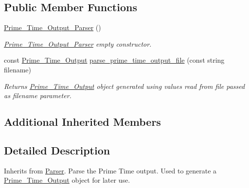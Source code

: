 \subsection*{Public Member Functions}
\begin{DoxyCompactItemize}
\item 
\hyperlink{classPrime__Time__Output__Parser_abbd1008efff182a6b8ce0f676b4ee823}{Prime\-\_\-\-Time\-\_\-\-Output\-\_\-\-Parser} ()
\begin{DoxyCompactList}\small\item\em \hyperlink{classPrime__Time__Output__Parser}{Prime\-\_\-\-Time\-\_\-\-Output\-\_\-\-Parser} empty constructor. \end{DoxyCompactList}\item 
const \hyperlink{classPrime__Time__Output__Parser_1_1Prime__Time__Output}{Prime\-\_\-\-Time\-\_\-\-Output} \hyperlink{classPrime__Time__Output__Parser_af43de199ba4575214a4d6e07fb980ca5}{parse\-\_\-prime\-\_\-time\-\_\-output\-\_\-file} (const string filename)
\begin{DoxyCompactList}\small\item\em Returns \hyperlink{classPrime__Time__Output__Parser_1_1Prime__Time__Output}{Prime\-\_\-\-Time\-\_\-\-Output} object generated using values read from file passed as filename parameter. \end{DoxyCompactList}\end{DoxyCompactItemize}
\subsection*{Additional Inherited Members}


\subsection{Detailed Description}
Inherits from \hyperlink{classParser}{Parser}. Parse the Prime Time output. Used to generate a \hyperlink{classPrime__Time__Output__Parser_1_1Prime__Time__Output}{Prime\-\_\-\-Time\-\_\-\-Output} object for later use. 

